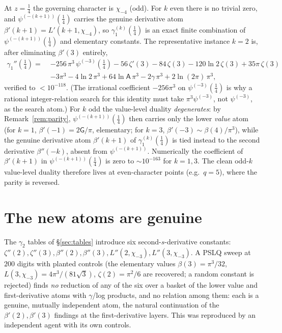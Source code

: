 \documentclass[11pt]{article}
\theoremstyle{remark}
\newcommand{\Glaisher}{\mathsf{A}}
\newcommand{\Cat}{\mathsf{G}}
\newcommand{\chim}[1]{\chi_{-#1}}
\begin{document}
At $z=\tfrac14$ the governing character is $\chim4$ (odd). For $k$ even there is
no trivial zero, and $\psi^{(-(k+1))}(\tfrac14)$ carries the genuine derivative
atom $\beta'(k{+}1)=L'(k{+}1,\chim4)$, so $\gamma_1^{(k)}(\tfrac14)$ is an exact
finite combination of $\psi^{(-(k+1))}(\tfrac14)$ and elementary constants. The
representative instance $k=2$ is, after eliminating $\beta'(3)$ entirely,
\begin{equation}\label{eq:k2duality}
\begin{aligned}
  \gamma_1''(\tfrac14)=\;&-256\,\pi^3\,\psi^{(-3)}(\tfrac14)
   -56\,\zeta'(3)-84\,\zeta(3)-120\ln2\,\zeta(3)+35\pi\,\zeta(3)\\
   &-3\pi^3-4\ln2\,\pi^3+64\ln\Glaisher\,\pi^3-2\gamma\,\pi^3+2\ln(2\pi)\,\pi^3 ,
\end{aligned}
\end{equation}
verified to $<10^{-118}$. (The irrational coefficient $-256\pi^3$ on
$\psi^{(-3)}(\tfrac14)$ is why a rational integer-relation search for this
identity must take $\pi^3\psi^{(-3)}$, not $\psi^{(-3)}$, as the search atom.)
For $k$ odd the value-level duality \emph{degenerates}: by
Remark~\ref{rem:parity}, $\psi^{(-(k+1))}(\tfrac14)$ then carries only the lower
\emph{value} atom (for $k=1$, $\beta'(-1)=2\Cat/\pi$, elementary; for $k=3$,
$\beta'(-3)\sim\beta(4)/\pi^3$), while the genuine derivative atom
$\beta'(k{+}1)$ of $\gamma_1^{(k)}(\tfrac14)$ is tied instead to the second
derivative $\beta''(-k)$, absent from $\psi^{(-(k+1))}$. Numerically the
coefficient of $\beta'(k{+}1)$ in $\psi^{(-(k+1))}(\tfrac14)$ is zero to $\sim
10^{-163}$ for $k=1,3$. The clean odd-$k$ value-level duality therefore lives at
even-character points (e.g.\ $q=5$), where the parity is reversed.

\section{The new atoms are genuine}\label{sec:atoms}

The $\gamma_2$ tables of \S\ref{sec:tables} introduce six second-$s$-derivative
constants:
$\zeta''(2),\zeta''(3),\beta''(2),\beta''(3),L''(2,\chim3),L''(3,\chim3)$. A
PSLQ sweep at $200$ digits with planted controls (the elementary values
$\beta(3)=\pi^3/32$, $L(3,\chim3)=4\pi^3/(81\sqrt3)$, $\zeta(2)=\pi^2/6$ are
recovered; a random constant is rejected) finds \emph{no} reduction of any of
the six over a basket of the lower value and first-derivative atoms with
$\gamma$/log products, and no relation among them: each is a genuine,
mutually independent atom, the natural continuation of the $\beta'(2),\beta'(3)$
findings at the first-derivative layers. This was reproduced by an independent
agent with its own controls.
\end{document}
